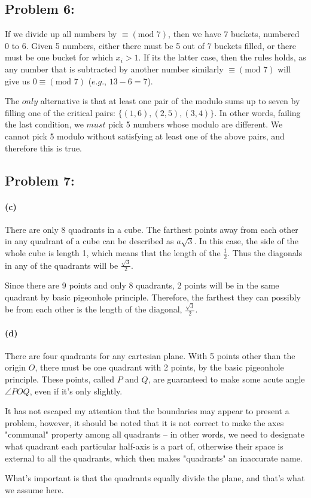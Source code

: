 \documentclass[a4paper]{article}
\begin{document}
\subsection*{Problem 6:}

If we divide up all numbers by $\equiv (\mbox{mod } 7)$, then we have 7 buckets, numbered 0 to 6. Given 5 numbers, either there must be 5 out of 7 buckets filled, or there must be one bucket for which $x_i > 1$. If its the latter case, then the rules holds, as any number that is subtracted by another number similarly $\equiv (\mbox{mod } 7)$ will give us $0 \equiv (\mbox{mod } 7)$ ($\textit{e.g.}$, $13-6 = 7$).

The $\textit{only}$ alternative is that at least one pair of the modulo sums up to seven by filling one of the critical pairs: $\{(1,6),(2,5),(3,4)\}$. In other words, failing the last condition, we $\textit{must}$ pick 5 numbers whose modulo are different. We cannot pick 5 modulo without satisfying at least one of the above pairs, and therefore this is true.

\subsection*{Problem 7:}

\paragraph{(c)} There are only 8 quadrants in a cube. The farthest points away from each other in any quadrant of a cube can be described as $a \sqrt{3}$. In this case, the side of the whole cube is length 1, which means that the length of the $\frac{1}{2}$. Thus the diagonals in any of the quadrants will be $\frac{\sqrt{3}}{2}$.

Since there are 9 points and only 8 quadrants, 2 points will be in the same quadrant by basic pigeonhole principle. Therefore, the farthest they can possibly be from each other is the length of the diagonal, $\frac{\sqrt{3}}{2}$.

\paragraph{(d)} There are four quadrants for any cartesian plane. With 5 points other than the origin $O$, there must be one quadrant with 2 points, by the basic pigeonhole principle. These points, called $P$ and $Q$, are guaranteed to make some acute angle $\angle POQ$, even if it's only slightly.

It has not escaped my attention that the boundaries may appear to present a problem, however, it should be noted that it is not correct to make the axes "communal" property among all quadrants -- in other words, we need to designate what quadrant each particular half-axis is a part of, otherwise their space is external to all the quadrants, which then makes "quadrants" an inaccurate name.

What's important is that the quadrants equally divide the plane, and that's what we assume here.
\end{document}

